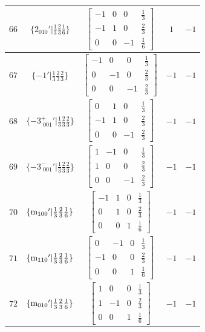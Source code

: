 \documentclass[fleqn,8pt]{jsarticle}
\begin{document}
\begin{longtable}{ccccc}
$ 66 $ & $ \{2{}_{010}{}'|\frac{1}{3} \frac{2}{3} \frac{1}{6}\} $ & $ \begin{bmatrix} -1 & 0 & 0 & \frac{1}{3} \\ -1 & 1 & 0 & \frac{2}{3} \\ 0 & 0 & -1 & \frac{1}{6} \end{bmatrix} $ & $ 1 $ & $ -1 $ \\ \hline
$ 67 $ & $ \{-1{}'|\frac{1}{3} \frac{2}{3} \frac{2}{3}\} $ & $ \begin{bmatrix} -1 & 0 & 0 & \frac{1}{3} \\ 0 & -1 & 0 & \frac{2}{3} \\ 0 & 0 & -1 & \frac{2}{3} \end{bmatrix} $ & $ -1 $ & $ -1 $ \\ \hline
$ 68 $ & $ \{-3^{+}_{\,\,001}{}'|\frac{1}{3} \frac{2}{3} \frac{2}{3}\} $ & $ \begin{bmatrix} 0 & 1 & 0 & \frac{1}{3} \\ -1 & 1 & 0 & \frac{2}{3} \\ 0 & 0 & -1 & \frac{2}{3} \end{bmatrix} $ & $ -1 $ & $ -1 $ \\ \hline
$ 69 $ & $ \{-3^{-}_{\,\,001}{}'|\frac{1}{3} \frac{2}{3} \frac{2}{3}\} $ & $ \begin{bmatrix} 1 & -1 & 0 & \frac{1}{3} \\ 1 & 0 & 0 & \frac{2}{3} \\ 0 & 0 & -1 & \frac{2}{3} \end{bmatrix} $ & $ -1 $ & $ -1 $ \\ \hline
$ 70 $ & $ \{{\rm m}_{100}{}'|\frac{1}{3} \frac{2}{3} \frac{1}{6}\} $ & $ \begin{bmatrix} -1 & 1 & 0 & \frac{1}{3} \\ 0 & 1 & 0 & \frac{2}{3} \\ 0 & 0 & 1 & \frac{1}{6} \end{bmatrix} $ & $ -1 $ & $ -1 $ \\ \hline
$ 71 $ & $ \{{\rm m}_{110}{}'|\frac{1}{3} \frac{2}{3} \frac{1}{6}\} $ & $ \begin{bmatrix} 0 & -1 & 0 & \frac{1}{3} \\ -1 & 0 & 0 & \frac{2}{3} \\ 0 & 0 & 1 & \frac{1}{6} \end{bmatrix} $ & $ -1 $ & $ -1 $ \\ \hline
$ 72 $ & $ \{{\rm m}_{010}{}'|\frac{1}{3} \frac{2}{3} \frac{1}{6}\} $ & $ \begin{bmatrix} 1 & 0 & 0 & \frac{1}{3} \\ 1 & -1 & 0 & \frac{2}{3} \\ 0 & 0 & 1 & \frac{1}{6} \end{bmatrix} $ & $ -1 $ & $ -1 $ \\
\end{longtable}
\end{document}
